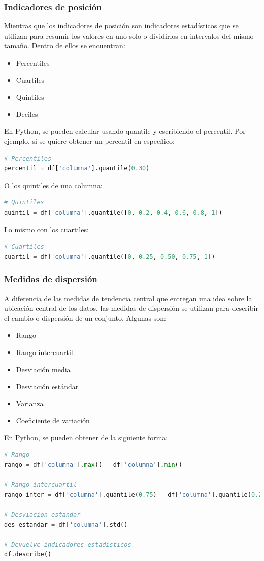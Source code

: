 \documentclass[a4paper, 12pt]{book}
\begin{document}
\subsubsection{Indicadores de posición}
Mientras que los indicadores de posición son indicadores estadísticos que se utilizan para resumir los valores en uno solo o dividirlos en intervalos del mismo tamaño. Dentro de ellos se encuentran:
\begin{itemize}
	\item Percentiles
	\item Cuartiles
	\item Quintiles
	\item Deciles
\end{itemize}
En Python, se pueden calcular usando quantile y escribiendo el percentil. Por ejemplo, si se quiere obtener un percentil en específico:
\begin{lstlisting}[language=Python]
# Percentiles
percentil = df['columna'].quantile(0.30)
\end{lstlisting}
O los quintiles de una columna:
\begin{lstlisting}[language=Python]
# Quintiles
quintil = df['columna'].quantile([0, 0.2, 0.4, 0.6, 0.8, 1])
\end{lstlisting}
Lo mismo con los cuartiles:
\begin{lstlisting}[language=Python]
# Cuartiles
cuartil = df['columna'].quantile([0, 0.25, 0.50, 0.75, 1])
\end{lstlisting}
\subsubsection{Medidas de dispersión}
A diferencia de las medidas de tendencia central que entregan una idea sobre la ubicación central de los datos, las medidas de dispersión se utilizan para describir el cambio o dispersión de un conjunto. Algunas son:
\begin{itemize}
	\item Rango
 	\item Rango intercuartil
 	\item Desviación media
 	\item Desviación estándar
 	\item Varianza
 	\item Coeficiente de variación
\end{itemize}
En Python, se pueden obtener de la siguiente forma:
\begin{lstlisting}[language=Python]
# Rango
rango = df['columna'].max() - df['columna'].min()
	
# Rango intercuartil
rango_inter = df['columna'].quantile(0.75) - df['columna'].quantile(0.25)

# Desviacion estandar
des_estandar = df['columna'].std()

# Devuelve indicadores estadisticos
df.describe()
\end{lstlisting}
\end{document}
